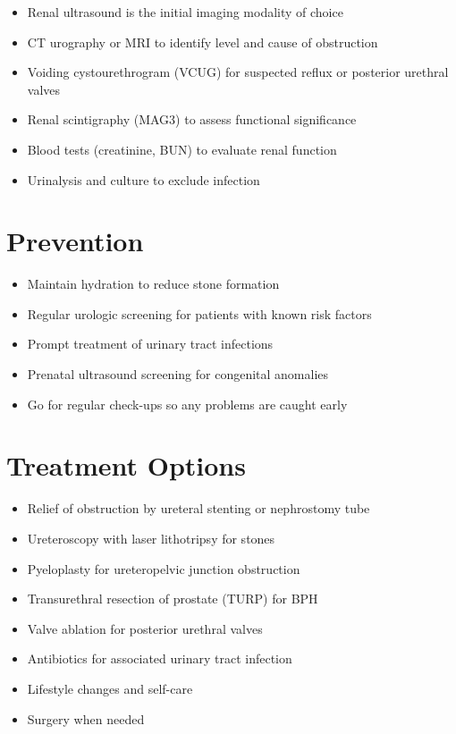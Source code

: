 \begin{itemize}[noitemsep]
  \item Renal ultrasound is the initial imaging modality of choice
  \item CT urography or MRI to identify level and cause of obstruction
  \item Voiding cystourethrogram (VCUG) for suspected reflux or posterior urethral valves
  \item Renal scintigraphy (MAG3) to assess functional significance
  \item Blood tests (creatinine, BUN) to evaluate renal function
  \item Urinalysis and culture to exclude infection
\end{itemize}

\section{Prevention}

\begin{itemize}[noitemsep]
  \item Maintain hydration to reduce stone formation
  \item Regular urologic screening for patients with known risk factors
  \item Prompt treatment of urinary tract infections
  \item Prenatal ultrasound screening for congenital anomalies
  \item Go for regular check-ups so any problems are caught early
\end{itemize}

\section{Treatment Options}

\begin{itemize}[noitemsep]
  \item Relief of obstruction by ureteral stenting or nephrostomy tube
  \item Ureteroscopy with laser lithotripsy for stones
  \item Pyeloplasty for ureteropelvic junction obstruction
  \item Transurethral resection of prostate (TURP) for BPH
  \item Valve ablation for posterior urethral valves
  \item Antibiotics for associated urinary tract infection
  \item Lifestyle changes and self-care
  \item Surgery when needed
\end{itemize}

